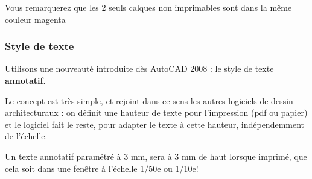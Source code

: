 \documentclass[a4paper,12pt,french]{sphinxmanual}
\begin{document}
Vous remarquerez que les 2 seuls calques non imprimables sont dans la même couleur magenta


\subsubsection{Style de texte}
\label{acad/config_acad:style-de-texte}
Utilisons une nouveauté introduite dès AutoCAD 2008 : le style de texte \textbf{annotatif}.

Le concept est très simple, et rejoint dans ce sens les autres logiciels de dessin architecturaux : on définit une hauteur de texte pour l'impression (pdf ou papier) et le logiciel fait le reste, pour adapter le texte à cette hauteur, indépendemment de l'échelle.

Un texte annotatif paramétré à 3 mm, sera à 3 mm de haut lorsque imprimé, que cela soit dans une fenêtre à l'échelle 1/50e ou 1/10e!
\end{document}

